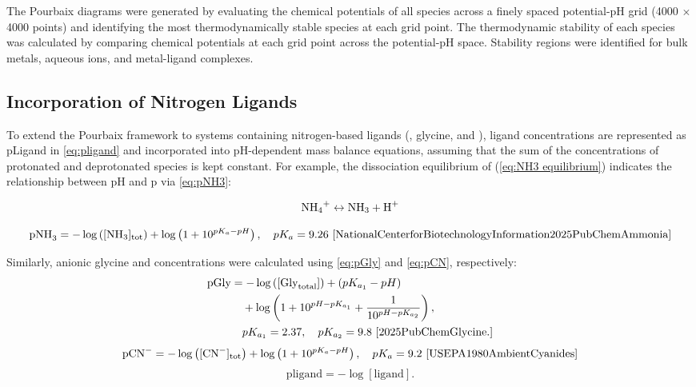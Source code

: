 \documentclass[journal=jacsat,manuscript=article]{achemso}
\begin{document}
The Pourbaix diagrams were generated by evaluating the chemical potentials of all species across a finely spaced potential-pH grid (4000 $\times$ 4000 points) and identifying the most thermodynamically stable species at each grid point. The thermodynamic stability of each species was calculated by comparing chemical potentials at each grid point across the potential-pH space. Stability regions were identified for bulk metals, aqueous ions, and metal-ligand complexes. 


\subsection{Incorporation of Nitrogen Ligands}

To extend the Pourbaix framework to systems containing nitrogen-based ligands (, glycine, and ), ligand concentrations are represented as pLigand in \ref{eq:pligand} and incorporated into pH-dependent mass balance equations, assuming that the sum of the concentrations of protonated and deprotonated species is kept constant. For example, the dissociation equilibrium of  (\ref{eq:NH3 equilibrium}) indicates the relationship between pH and p via \ref{eq:pNH3}:

\begin{equation} \label{eq:NH3 equilibrium}
\ce{NH4+} \leftrightarrow \ce{NH3} + \ce{H+}
\end{equation}

\begin{equation} \label{eq:pNH3}
\text{pNH}_3 = -\log \left([\text{NH}_3]_{\text{tot}}\right) + \log \left(1 + 10^{pK_a - pH} \right), \quad pK_a = 9.26 \text{ \cite{NationalCenterforBiotechnologyInformation2025PubChemAmmonia}}
\end{equation}

Similarly, anionic glycine and  concentrations were calculated using \ref{eq:pGly} and \ref{eq:pCN}, respectively:
\begin{align} \label{eq:pGly}
\text{pGly} &= -\log \left([\text{Gly}_{\text{total}}]\right) + (pK_{a_1} - pH) \nonumber \\
&\quad + \log \left(1 + 10^{pH - pK_{a_1}} + \frac{1}{10^{pH - pK_{a_2}}} \right), \nonumber \\
&\quad pK_{a_1} = 2.37, \quad pK_{a_2} = 9.8 \text{ \cite{2025PubChemGlycine.}}
\end{align}
\begin{equation} \label{eq:pCN}
\text{pCN}^- = -\log \left([\text{CN}^-]_{\text{tot}}\right) + \log \left(1 + 10^{pK_a - pH} \right), \quad pK_a = 9.2 \text{ \cite{USEPA1980AmbientCyanides}}
\end{equation}
\begin{equation} \label{eq:pligand}
\text{pligand} = -\log[\text{ligand}].
\end{equation}
\end{document}
